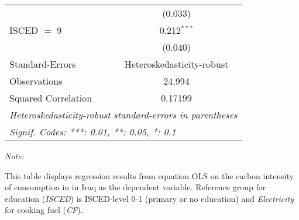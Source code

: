 \begin{table}[htbp!]
\begin{adjustbox}{width = 1\textwidth, max height = 0.95\textheight, center}
\begin{threeparttable}[b]
\begin{tabular}{lc}
                                & (0.033)\\   
            ISCED $=$ 9         & 0.212$^{***}$\\   
                                & (0.040)\\   
            \midrule 
            Standard-Errors     & Heteroskedasticity-robust \\   
            Observations        & 24,994\\  
            Squared Correlation & 0.17199\\  
            \midrule \midrule
            \multicolumn{2}{l}{\emph{Heteroskedasticity-robust standard-errors in parentheses}}\\
            \multicolumn{2}{l}{\emph{Signif. Codes: ***: 0.01, **: 0.05, *: 0.1}}\\
         \end{tabular}
         
         \begin{tablenotes}\item \medskip \textit{Note:}
            \item This table displays regression results from equation OLS on the carbon intensity of consumption in  in Iraq as the dependent variable. Reference group for education (\textit{ISCED}) is ISCED-level 0-1 (primary or no education) and \textit{Electricity} for cooking fuel (\textit{CF}).
         \end{tablenotes}
      \end{threeparttable}
   \end{adjustbox}
\end{table}


